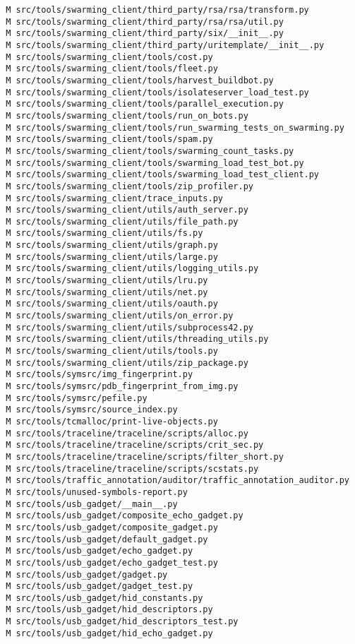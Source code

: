 \documentclass{article}
\begin{document}
\begin{verbatim}
 M src/tools/swarming_client/third_party/rsa/rsa/transform.py
 M src/tools/swarming_client/third_party/rsa/rsa/util.py
 M src/tools/swarming_client/third_party/six/__init__.py
 M src/tools/swarming_client/third_party/uritemplate/__init__.py
 M src/tools/swarming_client/tools/cost.py
 M src/tools/swarming_client/tools/fleet.py
 M src/tools/swarming_client/tools/harvest_buildbot.py
 M src/tools/swarming_client/tools/isolateserver_load_test.py
 M src/tools/swarming_client/tools/parallel_execution.py
 M src/tools/swarming_client/tools/run_on_bots.py
 M src/tools/swarming_client/tools/run_swarming_tests_on_swarming.py
 M src/tools/swarming_client/tools/spam.py
 M src/tools/swarming_client/tools/swarming_count_tasks.py
 M src/tools/swarming_client/tools/swarming_load_test_bot.py
 M src/tools/swarming_client/tools/swarming_load_test_client.py
 M src/tools/swarming_client/tools/zip_profiler.py
 M src/tools/swarming_client/trace_inputs.py
 M src/tools/swarming_client/utils/auth_server.py
 M src/tools/swarming_client/utils/file_path.py
 M src/tools/swarming_client/utils/fs.py
 M src/tools/swarming_client/utils/graph.py
 M src/tools/swarming_client/utils/large.py
 M src/tools/swarming_client/utils/logging_utils.py
 M src/tools/swarming_client/utils/lru.py
 M src/tools/swarming_client/utils/net.py
 M src/tools/swarming_client/utils/oauth.py
 M src/tools/swarming_client/utils/on_error.py
 M src/tools/swarming_client/utils/subprocess42.py
 M src/tools/swarming_client/utils/threading_utils.py
 M src/tools/swarming_client/utils/tools.py
 M src/tools/swarming_client/utils/zip_package.py
 M src/tools/symsrc/img_fingerprint.py
 M src/tools/symsrc/pdb_fingerprint_from_img.py
 M src/tools/symsrc/pefile.py
 M src/tools/symsrc/source_index.py
 M src/tools/tcmalloc/print-live-objects.py
 M src/tools/traceline/traceline/scripts/alloc.py
 M src/tools/traceline/traceline/scripts/crit_sec.py
 M src/tools/traceline/traceline/scripts/filter_short.py
 M src/tools/traceline/traceline/scripts/scstats.py
 M src/tools/traffic_annotation/auditor/traffic_annotation_auditor.py
 M src/tools/unused-symbols-report.py
 M src/tools/usb_gadget/__main__.py
 M src/tools/usb_gadget/composite_echo_gadget.py
 M src/tools/usb_gadget/composite_gadget.py
 M src/tools/usb_gadget/default_gadget.py
 M src/tools/usb_gadget/echo_gadget.py
 M src/tools/usb_gadget/echo_gadget_test.py
 M src/tools/usb_gadget/gadget.py
 M src/tools/usb_gadget/gadget_test.py
 M src/tools/usb_gadget/hid_constants.py
 M src/tools/usb_gadget/hid_descriptors.py
 M src/tools/usb_gadget/hid_descriptors_test.py
 M src/tools/usb_gadget/hid_echo_gadget.py

\end{verbatim}
\end{document}
